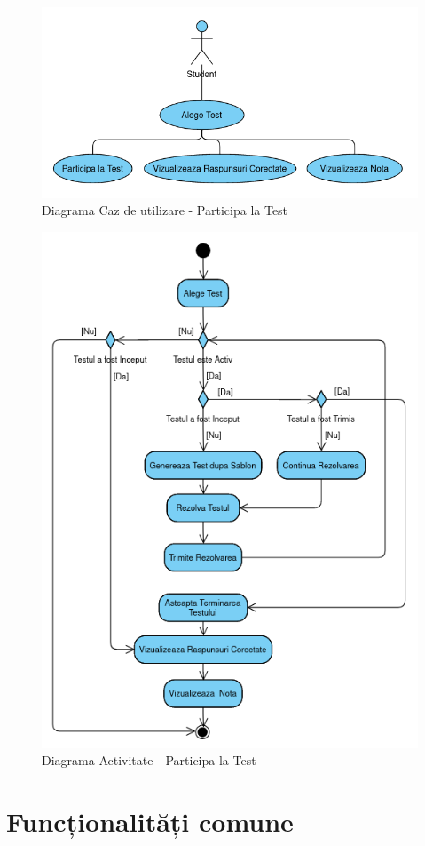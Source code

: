\documentclass[12pt, a4paper, oneside, romanian]{teza-upb}
\begin{document}
\begin{figure}[H]
\centering
\includegraphics*[width=0.75\columnwidth]{diagrama-use-case-participa-la-test}
\caption{Diagrama Caz de utilizare - Participa la Test}
\label{diagrama-use-case-participa-la-test}
\end{figure}


\begin{figure}[H]
\centering
\includegraphics*[width=0.75\columnwidth]{diagrama-activitate-participa-la-test}
\caption{Diagrama Activitate - Participa la Test}
\label{diagrama-activitate-participa-la-test}
\end{figure}

\section{Funcționalități comune}
\end{document}
